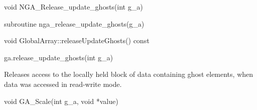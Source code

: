 \documentclass[12pt]{article}
\begin{document}
\begin{capi}
\begin{ccode}
void NGA_Release_update_ghosts(int g_a)
\end{ccode}
\begin{funcargs}
\end{funcargs}
\end{capi}

\begin{fapi}
\begin{fcode}
subroutine nga_release_update_ghosts(g_a)
\end{fcode}
\begin{funcargs}
\end{funcargs}
\end{fapi}

\begin{cxxapi}
\begin{cxxcode}
void GlobalArray::releaseUpdateGhosts() const
\end{cxxcode}
\end{cxxapi}

\begin{pyapi}
\begin{pycode}
ga.release_update_ghosts(int g_a)
\end{pycode}
\begin{funcargs}
\end{funcargs}
\end{pyapi}

\local

\begin{desc}

Releases access to the locally held block of data containing ghost elements,
when data was accessed in read-write mode.

\end{desc}



\begin{capi}
\begin{ccode}
void GA_Scale(int g_a, void *value)
\end{ccode}
\begin{funcargs}
\end{funcargs}
\end{capi}
\end{document}
